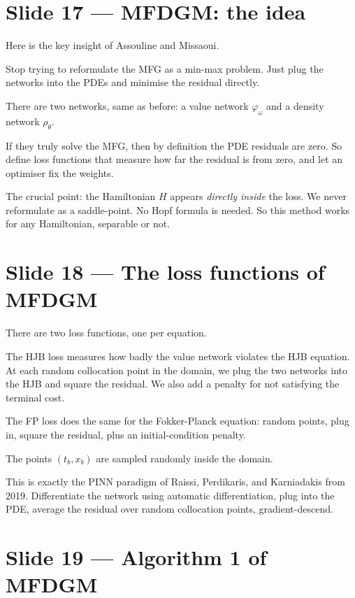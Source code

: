\documentclass[11pt]{article}
\begin{document}
\section*{Slide 17 --- MFDGM: the idea}

Here is the key insight of Assouline and Missaoui.

Stop trying to reformulate the MFG as a min-max problem.  Just plug the
networks into the PDEs and minimise the residual directly.

There are two networks, same as before: a value network $\varphi_\omega$
and a density network $\rho_\theta$.

If they truly solve the MFG, then by definition the PDE residuals are
zero.  So define loss functions that measure how far the residual is
from zero, and let an optimiser fix the weights.

The crucial point: the Hamiltonian $H$ appears \emph{directly inside}
the loss.  We never reformulate as a saddle-point.  No Hopf formula is
needed.  So this method works for any Hamiltonian, separable or not.

\section*{Slide 18 --- The loss functions of MFDGM}

There are two loss functions, one per equation.

The HJB loss measures how badly the value network violates the HJB
equation.  At each random collocation point in the domain, we plug the
two networks into the HJB and square the residual.  We also add a
penalty for not satisfying the terminal cost.

The FP loss does the same for the Fokker-Planck equation: random
points, plug in, square the residual, plus an initial-condition penalty.

The points $(t_b, x_b)$ are sampled randomly inside the domain.

This is exactly the PINN paradigm of Raissi, Perdikaris, and
Karniadakis from 2019.  Differentiate the network using automatic
differentiation, plug into the PDE, average the residual over random
collocation points, gradient-descend.

\section*{Slide 19 --- Algorithm 1 of MFDGM}
\end{document}
